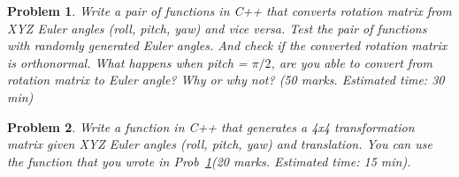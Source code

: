 \documentclass{article}
\newtheorem{prob}{Problem}
\newif\ifsol
\begin{document}
\fi

\begin{prob}
  Write a pair of functions in C++ that converts rotation matrix from XYZ Euler
angles (roll, pitch, yaw) and vice versa. Test the pair of functions with
randomly generated Euler angles. And check if the converted rotation matrix is
orthonormal. What happens when pitch = $\pi/2$, are you able to convert from
rotation matrix to Euler angle? Why or why not? (50 marks. Estimated time: 30 min)
\label{prob:euler-to-rotmat}
\end{prob}

\ifsol
\paragraph*{Solution}
Please check function \verb|euler_to_rotmat| and \verb|rotmat_to_euler_rpy| in
\verb|hw1.cpp|. When pitch $=\frac{\pi}{2}$ works some of the time, but not all the time because of the
Gimbal lock matrix to Euler angle conversion has multiple possible solutions.
\fi

\begin{prob}
  Write a function in C++ that generates a 4x4 transformation matrix given XYZ Euler
  angles (roll, pitch, yaw) and translation. You can use the function that you
  wrote in Prob~\ref{prob:euler-to-rotmat}(20 marks. Estimated time: 15 min).
\end{prob}

\ifsol
\paragraph*{Solution}
Please check function \verb|transformation_matrix| in \verb|hw1.cpp|
\fi
\end{document}
